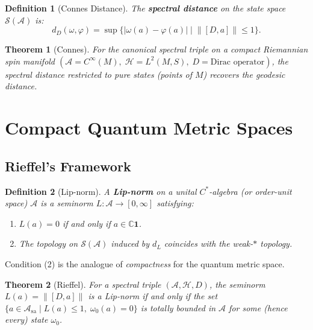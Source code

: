 \documentclass[11pt,a4paper]{article}
\newtheorem{definition}{Definition}[section]
\newtheorem{theorem}{Theorem}[section]
\begin{document}
\begin{definition}[Connes Distance]
The \textbf{spectral distance} on the state space $\mathcal{S}(\mathcal{A})$ is:
\begin{equation}
  d_D(\omega, \varphi) = \sup\bigl\{|\omega(a) - \varphi(a)| \;\big|\;
  \|[D, a]\| \leq 1\bigr\}.
\end{equation}
\end{definition}

\begin{theorem}[Connes]
For the canonical spectral triple on a compact Riemannian spin manifold
$(\mathcal{A} = C^\infty(M),\; \mathcal{H} = L^2(M, S),\; D = \text{Dirac operator})$,
the spectral distance restricted to pure states (points of $M$) recovers the
geodesic distance.
\end{theorem}

\section{Compact Quantum Metric Spaces}

\subsection{Rieffel's Framework}

\begin{definition}[Lip-norm]
A \textbf{Lip-norm} on a unital $C^*$-algebra (or order-unit space)
$\mathcal{A}$ is a seminorm $L: \mathcal{A} \to [0, \infty]$ satisfying:
\begin{enumerate}[nosep]
  \item $L(a) = 0$ if and only if $a \in \mathbb{C}\mathbf{1}$.
  \item The topology on $\mathcal{S}(\mathcal{A})$ induced by $d_L$ coincides
        with the weak-$*$ topology.
\end{enumerate}
\end{definition}

Condition (2) is the analogue of \emph{compactness} for the quantum metric space.

\begin{theorem}[Rieffel]
For a spectral triple $(\mathcal{A}, \mathcal{H}, D)$, the seminorm
$L(a) = \|[D, a]\|$ is a Lip-norm if and only if the set
$\{a \in \mathcal{A}_{\mathrm{sa}} \mid L(a) \leq 1,\; \omega_0(a) = 0\}$
is totally bounded in $\mathcal{A}$ for some (hence every) state $\omega_0$.
\end{theorem}
\end{document}
